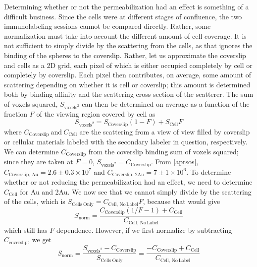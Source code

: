 Determining whether or not the permeabilization had an effect is something of a difficult business. Since the cells were at different stages of confluence, the two immunolabeling sessions cannot be compared directly. Rather, some normalization must take into account the different amount of cell coverage. It is not sufficient to simply divide by the scattering from the cells, as that ignores the binding of the spheres to the coverslip. Rather, let us approximate the coverslip and cells as a 2D grid, each pixel of which is either occupied completely by cell or completely by coverslip. Each pixel then contributes, on average, some amount of scattering depending on whether it is cell or coverslip; this amount is determined both by binding affinity and the scattering cross section of the scatterer. The sum of voxels squared, $S_{\mathrm{voxels}^2}$ can then be determined on average as a function of the fraction $F$ of the viewing region covered by cell as
\[S_{\mathrm{voxels}^2}=S_{\mathrm{Coverslip}}(1-F)+S_{\mathrm{Cell}}F\]
where $C_{\mathrm{Coverslip}}\mathrm{\ and\ }C_{\mathrm{Cell}}$ are the scattering from a view of view filled by coverslip or cellular materials labeled with the secondary labeler in question, respectively. We can determine $C_{\mathrm{Coverslip}}$ from the coverslip binding sum of voxels squared; since they are taken at $F=0$, $S_{\mathrm{voxels}^2}=C_{\mathrm{Coverslip}}$. From \autoref{aprsos}, $C_{\mathrm{Coverslip,\,Au}}=2.6\pm0.3\times10^7$ and $C_{\mathrm{Coverslip,\,2Au}}=7\pm1\times10^6$. To determine whether or not reducing the permeabilization had an effect, we need to determine $C_{\mathrm{Cell}}$ for Au and 2Au. We now see that we cannot simply divide by the scattering of the cells, which is $S_{\mathrm{Cells\ Only}}=C_{\mathrm{Cell,\,No\, Label}}F$, because that would give
\[S_{\mathrm{norm}}=\frac{C_{\mathrm{Coverslip}}(1/F-1)+C_{\mathrm{Cell}}}{C_{\mathrm{Cell,\,No\, Label}}}\]
which still has $F$ dependence. However, if we first normalize by subtracting $C_{\mathrm{coverslip}}$, we get
\begin{equation}
S_{\mathrm{norm}}=\frac{S_{\mathrm{voxels}^2}-C_{\mathrm{Coverslip}}}{S_{\mathrm{Cells\ Only}}}=\frac{-C_{\mathrm{Coverslip}}+C_{\mathrm{Cell}}}{C_{\mathrm{Cell,\,No\, Label}}}
\label{eq:normalization}
\end{equation}
